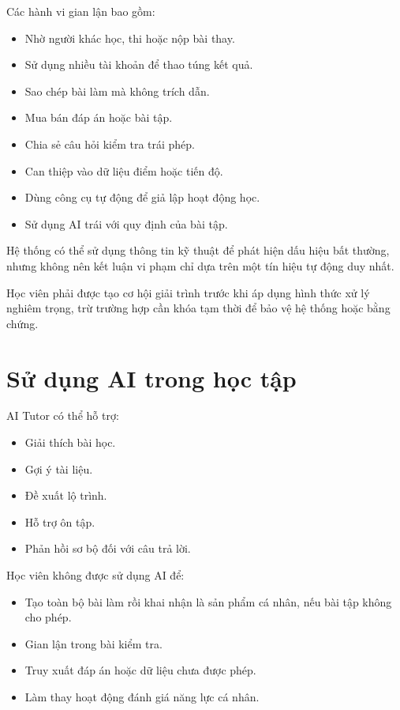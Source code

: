 \documentclass[12pt,a4paper]{article}
\begin{document}
Các hành vi gian lận bao gồm:

\begin{itemize}
    \item Nhờ người khác học, thi hoặc nộp bài thay.
    \item Sử dụng nhiều tài khoản để thao túng kết quả.
    \item Sao chép bài làm mà không trích dẫn.
    \item Mua bán đáp án hoặc bài tập.
    \item Chia sẻ câu hỏi kiểm tra trái phép.
    \item Can thiệp vào dữ liệu điểm hoặc tiến độ.
    \item Dùng công cụ tự động để giả lập hoạt động học.
    \item Sử dụng AI trái với quy định của bài tập.
\end{itemize}

Hệ thống có thể sử dụng thông tin kỹ thuật để phát hiện dấu hiệu bất thường,
nhưng không nên kết luận vi phạm chỉ dựa trên một tín hiệu tự động duy nhất.

Học viên phải được tạo cơ hội giải trình trước khi áp dụng hình thức xử lý nghiêm trọng,
trừ trường hợp cần khóa tạm thời để bảo vệ hệ thống hoặc bằng chứng.

\section{Sử dụng AI trong học tập}

AI Tutor có thể hỗ trợ:

\begin{itemize}
    \item Giải thích bài học.
    \item Gợi ý tài liệu.
    \item Đề xuất lộ trình.
    \item Hỗ trợ ôn tập.
    \item Phản hồi sơ bộ đối với câu trả lời.
\end{itemize}

Học viên không được sử dụng AI để:

\begin{itemize}
    \item Tạo toàn bộ bài làm rồi khai nhận là sản phẩm cá nhân,
    nếu bài tập không cho phép.
    \item Gian lận trong bài kiểm tra.
    \item Truy xuất đáp án hoặc dữ liệu chưa được phép.
    \item Làm thay hoạt động đánh giá năng lực cá nhân.
\end{itemize}
\end{document}
